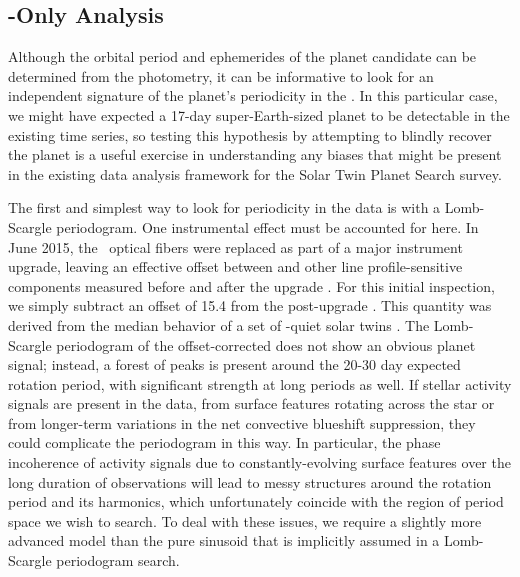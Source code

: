 \documentclass[modern]{aastex62}
\begin{document}
\subsection{\RV-Only Analysis}
\label{s:analysis:rvs}

Although the orbital period and ephemerides of the planet candidate can be determined from the photometry, it can be informative to look for an independent signature of the planet's periodicity in the \RVs. 
In this particular case, we might have expected a 17-day super-Earth-sized planet to be detectable in the existing \RV time series, so testing this hypothesis by attempting to blindly recover the planet is a useful exercise in understanding any biases that might be present in the existing data analysis framework for the Solar Twin Planet Search \RV survey.

The first and simplest way to look for periodicity in the \RV data is with a Lomb-Scargle periodogram. 
One instrumental effect must be accounted for here. 
In June 2015, the \HARPS\ optical fibers were replaced as part of a major instrument upgrade, leaving an effective offset between \RVs and other line profile-sensitive components measured before and after the upgrade \citep{Lovis15}. 
For this initial inspection, we simply subtract an offset of 15.4 \ms from the post-upgrade \RVs. 
This quantity was derived from the median behavior of a set of \RV-quiet solar twins \citep{Melendez17}. 
The Lomb-Scargle periodogram of the offset-corrected \RVs does not show an obvious planet signal; instead, a forest of peaks is present around the 20-30 day expected rotation period, with significant strength at long periods as well. 
If stellar activity signals are present in the data, from surface features rotating across the star or from longer-term variations in the net convective blueshift suppression, they could complicate the periodogram in this way. 
In particular, the phase incoherence of activity signals due to constantly-evolving surface features over the long duration of \RV observations will lead to messy structures around the rotation period and its harmonics, which unfortunately coincide with the region of period space we wish to search. 
To deal with these issues, we require a slightly more advanced model than the pure sinusoid that is implicitly assumed in a Lomb-Scargle periodogram search.
\end{document}
